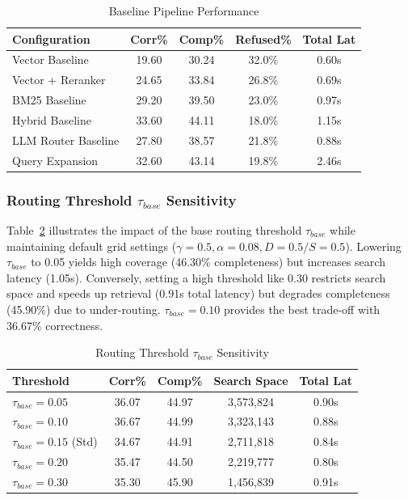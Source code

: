 \documentclass[conference]{IEEEtran}
\begin{document}
\begin{table}[htbp]
\caption{Baseline Pipeline Performance}
\label{tab:baselines}
\begin{center}
\footnotesize
\setlength{\tabcolsep}{4pt}
\begin{tabular}{lcccc}
\toprule
\textbf{Configuration} & \textbf{Corr\%} & \textbf{Comp\%} & \textbf{Refused\%} & \textbf{Total Lat} \\
\midrule
Vector Baseline & 19.60 & 30.24 & 32.0\% & 0.60s \\
Vector + Reranker & 24.65 & 33.84 & 26.8\% & 0.69s \\
BM25 Baseline & 29.20 & 39.50 & 23.0\% & 0.97s \\
Hybrid Baseline & 33.60 & 44.11 & 18.0\% & 1.15s \\
LLM Router Baseline & 27.80 & 38.57 & 21.8\% & 0.88s \\
Query Expansion & 32.60 & 43.14 & 19.8\% & 2.46s \\
\bottomrule
\end{tabular}
\end{center}
\end{table}

\subsubsection{Routing Threshold \texorpdfstring{$\tau_{base}$}{Tau} Sensitivity}
Table~\ref{tab:tau} illustrates the impact of the base routing threshold $\tau_{base}$ while maintaining default grid settings ($\gamma=0.5, \alpha=0.08, D=0.5/S=0.5$). Lowering $\tau_{base}$ to 0.05 yields high coverage (46.30\% completeness) but increases search latency (1.05s). Conversely, setting a high threshold like 0.30 restricts search space and speeds up retrieval (0.91s total latency) but degrades completeness (45.90\%) due to under-routing. $\tau_{base}=0.10$ provides the best trade-off with 36.67\% correctness.

\begin{table}[htbp]
\caption{Routing Threshold $\tau_{base}$ Sensitivity}
\label{tab:tau}
\begin{center}
\footnotesize
\setlength{\tabcolsep}{4pt}
\begin{tabular}{lcccc}
\toprule
\textbf{Threshold} & \textbf{Corr\%} & \textbf{Comp\%} & \textbf{Search Space} & \textbf{Total Lat} \\
\midrule
$\tau_{base}=0.05$ & 36.07 & 44.97 & 3,573,824 & 0.90s \\
$\tau_{base}=0.10$ & 36.67 & 44.99 & 3,323,143 & 0.88s \\
$\tau_{base}=0.15$ (Std) & 34.67 & 44.91 & 2,711,818 & 0.84s \\
$\tau_{base}=0.20$ & 35.47 & 44.50 & 2,219,777 & 0.80s \\
$\tau_{base}=0.30$ & 35.30 & 45.90 & 1,456,839 & 0.91s \\
\bottomrule
\end{tabular}
\end{center}
\end{table}
\end{document}

